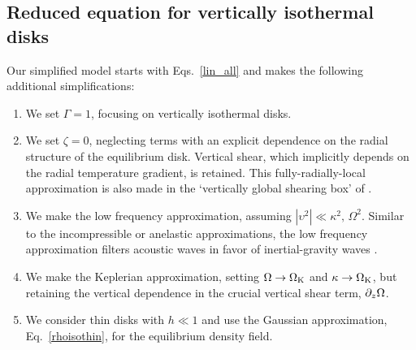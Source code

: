 \subsection{Reduced equation for vertically isothermal disks}\label{sec:simplified}

Our simplified model starts with  Eqs.\ \ref{lin_all} 
and makes the following additional simplifications:

\begin{enumerate}
 
 \item We set $\Gamma = 1$, focusing on vertically isothermal disks.
  
\item  We set $\zeta = 0$,  neglecting terms with an explicit dependence on the 
radial structure of the equilibrium disk.  Vertical shear, which implicitly depends on the radial
temperature gradient, is retained.  This fully-radially-local approximation is also made in the
 `vertically global shearing box' of . 

\item We make the low frequency approximation, assuming $|\upsilon^2|\ll \kappa^2,\,\Omega^2$. 
Similar to the incompressible  or anelastic  approximations,
the low frequency approximation filters acoustic waves in favor of
inertial-gravity waves \citep{lubow93}.  

\item We make the Keplerian approximation, setting $\Omega \rightarrow \Omega_{\rm K}$ 
and $\kappa \rightarrow \Omega_{\rm K}$, but retaining the vertical dependence 
in the crucial vertical shear term,
  $\partial_z\Omega$. 
  
\item We consider thin disks with $h\ll 1$ 
  and use the Gaussian approximation, Eq.\ \ref{rhoisothin}, for the equilibrium density field.  

\end{enumerate}
